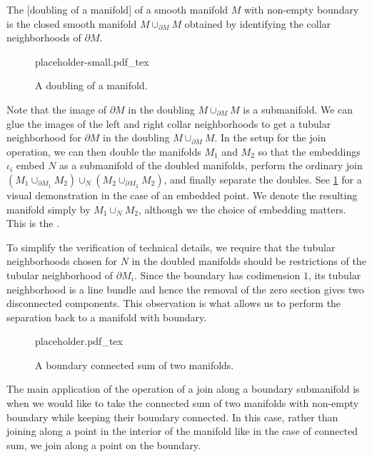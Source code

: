 \begin{definition}
	The [doubling of a manifold] of a smooth manifold $M$ with non-empty boundary is the closed smooth manifold $M\cup_{\partial M} M$ obtained by identifying the collar neighborhoods of $\partial M$.
\end{definition}
\begin{figure}[ht]
	\centering
	{placeholder-small.pdf_tex}
	\caption{A doubling of a manifold.}
\end{figure}
Note that the image of $\partial M$ in the doubling $M\cup_{\partial M} M$ is a submanifold. We can glue the images of the left and right collar neighborhoods to get a tubular neighborhood for $\partial M$ in the doubling $M\cup_{\partial M} M$.
In the setup for the join operation, we can then double the manifolds $M_1$ and $M_2$ so that the embeddings $\iota_i$ embed $N$ as a submanifold of the doubled manifolds, perform the ordinary join $(M_1\cup_{\partial M_1} M_2)\cup_N (M_2\cup_{\partial M_2} M_2)$, and finally separate the doubles. See \cref{fig:boundary-connected-sum} for a visual demonstration in the case of an embedded point. We denote the resulting manifold simply by $M_1\cup_N M_2$, although we the choice of embedding matters. This is the .

\begin{remark}
	To simplify the verification of technical details, we require that the tubular neighborhoods chosen for $N$ in the doubled manifolds should be restrictions of the tubular neighborhood of $\partial M_i$. Since the boundary has codimension $1$, its tubular neighborhood is a line bundle and hence the removal of the zero section gives two disconnected components. This observation is what allows us to perform the separation back to a manifold with boundary.
\end{remark}

\begin{figure}[ht]
	\centering
	{placeholder.pdf_tex}
	\caption{A boundary connected sum of two manifolds.}\label{fig:boundary-connected-sum}
\end{figure}

The main application of the operation of a join along a boundary submanifold is when we would like to take the connected sum of two manifolds with non-empty boundary while keeping their boundary connected. In this case, rather than joining along a point in the interior of the manifold like in the case of connected sum, we join along a point on the boundary.


